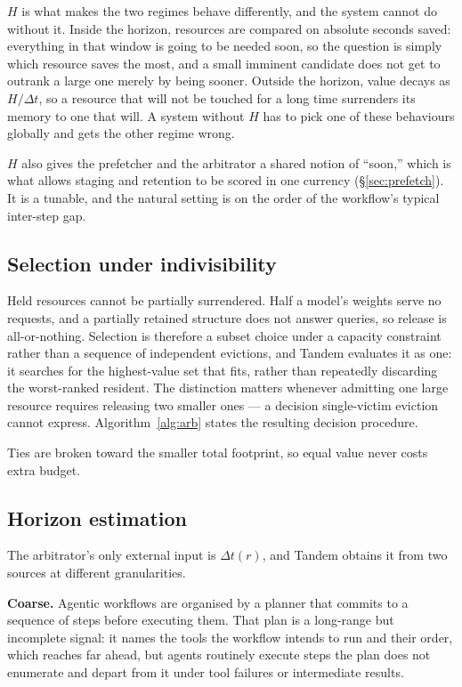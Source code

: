 \documentclass[10pt,twocolumn]{article}
\newcommand{\sysname}{Tandem\xspace}   %
\begin{document}
$H$ is what makes the two regimes behave differently, and the system cannot
do without it. Inside the horizon, resources are compared on absolute
seconds saved: everything in that window is going to be needed soon, so the
question is simply which resource saves the most, and a small imminent
candidate does not get to outrank a large one merely by being sooner.
Outside the horizon, value decays as $H/\Delta t$, so a resource that will
not be touched for a long time surrenders its memory to one that will. A
system without $H$ has to pick one of these behaviours globally and gets the
other regime wrong.

$H$ also gives the prefetcher and the arbitrator a shared notion of ``soon,''
which is what allows staging and retention to be scored in one currency
(\S\ref{sec:prefetch}). It is a tunable, and the natural setting is on the
order of the workflow's typical inter-step gap.

\subsection{Selection under indivisibility}

Held resources cannot be partially surrendered. Half a model's weights serve
no requests, and a partially retained structure does not answer queries, so
release is all-or-nothing. Selection is therefore a subset choice under a
capacity constraint rather than a sequence of independent evictions, and
\sysname evaluates it as one: it searches for the highest-value set that
fits, rather than repeatedly discarding the worst-ranked resident. The
distinction matters whenever admitting one large resource requires releasing
two smaller ones --- a decision single-victim eviction cannot express.
Algorithm~\ref{alg:arb} states the resulting decision procedure.

Ties are broken toward the smaller total footprint, so equal value never
costs extra budget.

\subsection{Horizon estimation}
\label{sec:horizon}

The arbitrator's only external input is $\Delta t(r)$, and \sysname obtains
it from two sources at different granularities.

\textbf{Coarse.} Agentic workflows are organised by a planner that commits to
a sequence of steps before executing them. That plan is a long-range but
incomplete signal: it names the tools the workflow intends to run and their
order, which reaches far ahead, but agents routinely execute steps the plan
does not enumerate and depart from it under tool failures or intermediate
results.
\end{document}
